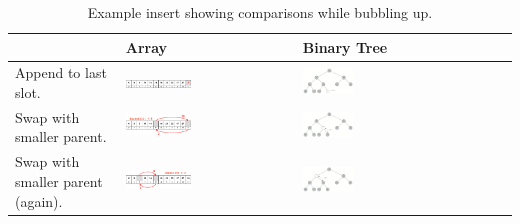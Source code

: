 \begin{center}
	\begin{table}
		\begin{tabular}{|p{}|M{0.4\textwidth}|M{0.30\textwidth}|}
			\hline
			  & Array & Binary Tree \\
			\hline
			Append to last slot. &
			\includegraphics[width=0.4\textwidth]{images/3013_heap_insert_1_2020.png}
			&
			\includegraphics[width=0.25\textwidth]{images/3013_heap_percup_1.png}\\
			\hline
			Swap with smaller parent. &
			\includegraphics[width=0.4\textwidth]{images/3013_heap_insert_2_2020.png}
			&
			\includegraphics[width=0.25\textwidth]{images/3013_heap_percup_2.png}\\
			\hline
			Swap with smaller parent (again). &
			\includegraphics[width=0.4\textwidth]{images/3013_heap_insert_3_2020.png}
			&
			\includegraphics[width=0.25\textwidth]{images/3013_heap_percup_3.png}\\
			\hline
		\end{tabular}
		\caption{Example insert showing comparisons while bubbling up.}
		\label{tab:exinsertheap}
	\end{table}
\end{center}

